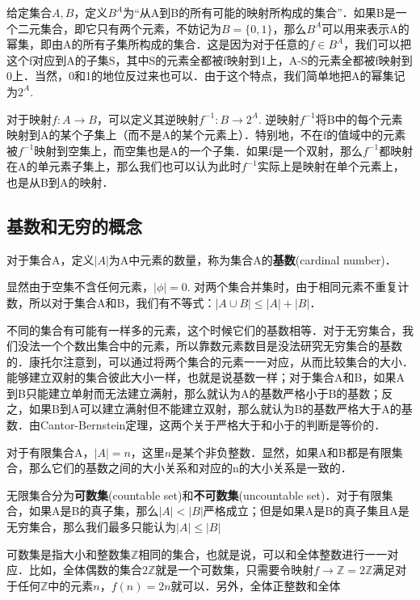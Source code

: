 {给定集合$A, B$，定义$B^A$为“从A到B的所有可能的映射所构成的集合”．如果B是一个二元集合，即它只有两个元素，不妨记为$B=\{0,1\}$，那么$B^A$可以用来表示A的幂集，即由A的所有子集所构成的集合．这是因为对于任意的$f\in B^A$，我们可以把这个f对应到A的子集S，其中S的元素全都被f映射到1上，A-S的元素全都被f映射到0上．当然，0和1的地位反过来也可以．由于这个特点，我们简单地把A的幂集记为$2^A$. 

对于映射$f:A\rightarrow B$，可以定义其逆映射$f^{-1}:B\rightarrow 2^A$. 逆映射$f^{-1}$将B中的每个元素映射到A的某个子集上（而不是A的某个元素上）．特别地，不在f的值域中的元素被$f^{-1}$映射到空集上，而空集也是A的一个子集．如果f是一个双射，那么$f^{-1}$都映射在A的单元素子集上，那么我们也可以认为此时$f^{-1}$实际上是映射在单个元素上，也是从B到A的映射．





\subsection{基数和无穷的概念}

对于集合A，定义$|A|$为A中元素的数量，称为集合A的\textbf{基数}(cardinal number)．

显然由于空集不含任何元素，$|\phi|=0$. 对两个集合并集时，由于相同元素不重复计数，所以对于集合A和B，我们有不等式：$|A\cup B|\le|A|+|B|$．

不同的集合有可能有一样多的元素，这个时候它们的基数相等．对于无穷集合，我们没法一个个数出集合中的元素，所以靠数元素数目是没法研究无穷集合的基数的．康托尔注意到，可以通过将两个集合的元素一一对应，从而比较集合的大小．能够建立双射的集合彼此大小一样，也就是说基数一样；对于集合A和B，如果A到B只能建立单射而无法建立满射，那么就认为A的基数严格小于B的基数；反之，如果B到A可以建立满射但不能建立双射，那么就认为B的基数严格大于A的基数．由Cantor-Bernstein定理，这两个关于严格大于和小于的判断是等价的．

对于有限集合A，$|A|=n$，这里$n$是某个非负整数．显然，如果A和B都是有限集合，那么它们的基数之间的大小关系和对应的n的大小关系是一致的．

无限集合分为\textbf{可数集}(countable set)和\textbf{不可数集}(uncountable set)．对于有限集合，如果A是B的真子集，那么$|A|<|B|$严格成立；但是如果A是B的真子集且A是无穷集合，那么我们最多只能认为$|A|\le|B|$

可数集是指大小和整数集$\mathbb{Z}$相同的集合，也就是说，可以和全体整数进行一一对应．比如，全体偶数的集合$2\mathbb{Z}$就是一个可数集，只需要令映射$f\rightarrow \mathbb{Z}=2\mathbb{Z}$满足对于任何$\mathbb{Z}$中的元素$n$，$f(n)=2n$就可以．另外，全体正整数和全体

}
